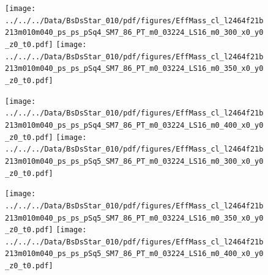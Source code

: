 \documentclass[a4paper,10pt]{article}
\begin{document}
\clearpage
\begin{figure}[p]
 \texttt{[image: ../../../Data/BsDsStar\_010/pdf/figures/EffMass\_cl\_l2464f21b213m010m040\_ps\_ps\_pSq4\_SM7\_86\_PT\_m0\_03224\_LS16\_m0\_300\_x0\_y0\_z0\_t0.pdf]} 
 \texttt{[image: ../../../Data/BsDsStar\_010/pdf/figures/EffMass\_cl\_l2464f21b213m010m040\_ps\_ps\_pSq4\_SM7\_86\_PT\_m0\_03224\_LS16\_m0\_350\_x0\_y0\_z0\_t0.pdf]} 
 \end{figure}
\begin{figure}[p]
 \texttt{[image: ../../../Data/BsDsStar\_010/pdf/figures/EffMass\_cl\_l2464f21b213m010m040\_ps\_ps\_pSq4\_SM7\_86\_PT\_m0\_03224\_LS16\_m0\_400\_x0\_y0\_z0\_t0.pdf]} 
 \texttt{[image: ../../../Data/BsDsStar\_010/pdf/figures/EffMass\_cl\_l2464f21b213m010m040\_ps\_ps\_pSq5\_SM7\_86\_PT\_m0\_03224\_LS16\_m0\_300\_x0\_y0\_z0\_t0.pdf]} 
 \end{figure}
\begin{figure}[p]
 \texttt{[image: ../../../Data/BsDsStar\_010/pdf/figures/EffMass\_cl\_l2464f21b213m010m040\_ps\_ps\_pSq5\_SM7\_86\_PT\_m0\_03224\_LS16\_m0\_350\_x0\_y0\_z0\_t0.pdf]} 
 \texttt{[image: ../../../Data/BsDsStar\_010/pdf/figures/EffMass\_cl\_l2464f21b213m010m040\_ps\_ps\_pSq5\_SM7\_86\_PT\_m0\_03224\_LS16\_m0\_400\_x0\_y0\_z0\_t0.pdf]} 
 \end{figure}
\clearpage
\clearpage
\end{document}
